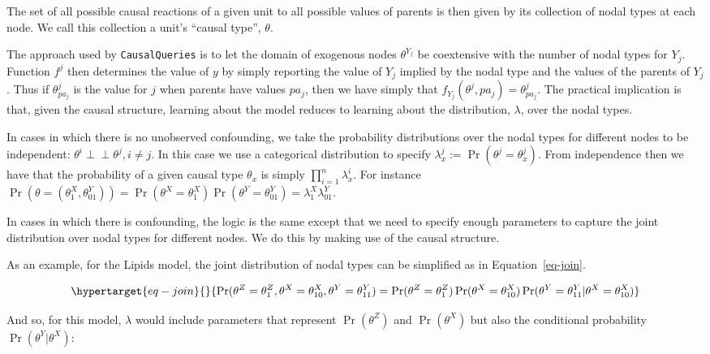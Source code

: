 \documentclass[
  11pt,
  article]{jss}
\begin{document}
The set of all possible causal reactions of a given unit to all possible
values of parents is then given by its collection of nodal types at each
node. We call this collection a unit's ``causal type'', \(\theta\).

The approach used by \texttt{CausalQueries} is to let the domain of
exogenous nodes \(\theta^{Y_j}\) be coextensive with the number of nodal
types for \(Y_j\). Function \(f^j\) then determines the value of \(y\)
by simply reporting the value of \(Y_j\) implied by the nodal type and
the values of the parents of \(Y_j\). Thus if \(\theta^j_{pa_j}\) is the
value for \(j\) when parents have values \(pa_j\), then we have simply
that \(f_{Y_j}(\theta^{j}, pa_j) = \theta^j_{pa_j}\). The practical
implication is that, given the causal structure, learning about the
model reduces to learning about the distribution, \(\lambda\), over the
nodal types.

In cases in which there is no unobserved confounding, we take the
probability distributions over the nodal types for different nodes to be
independent: \(\theta^i \perp\!\!\! \perp \theta^j, i\neq j\). In this
case we use a categorical distribution to specify
\({\lambda^j_x} := \Pr(\theta^j = {\theta^j_x})\). From independence
then we have that the probability of a given causal type \(\theta_x\) is
simply \(\prod_{i=1}^n {\lambda^i_x}\). For instance
\(\Pr(\theta = (\theta^X_1, \theta^Y_{01})) = \Pr(\theta^X = \theta^X_1)\Pr(\theta^Y = \theta^Y_{01}) = \lambda^X_1\lambda^Y_{01}\).

In cases in which there is confounding, the logic is the same except
that we need to specify enough parameters to capture the joint
distribution over nodal types for different nodes. We do this by making
use of the causal structure.

As an example, for the Lipids model, the joint distribution of nodal
types can be simplified as in Equation~\ref{eq-join}.

\begin{equation}\protect\hypertarget{eq-join}{}{
\Pr(\theta^Z = \theta^Z_1, \theta^X = \theta^X_{10}, \theta^Y = \theta^Y_{11}) = 
\Pr(\theta^Z = \theta^Z_1)\Pr(\theta^X = \theta^X_{10})\Pr(\theta^Y = \theta^Y_{11}|\theta^X = \theta^X_{10})
}\label{eq-join}\end{equation}

And so, for this model, \(\lambda\) would include parameters that
represent \(\Pr(\theta^Z)\) and \(\Pr(\theta^X)\) but also the
conditional probability \(\Pr(\theta^Y|\theta^X)\):
\end{document}
